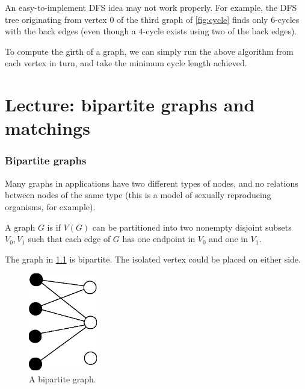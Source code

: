 \begin{note}
An easy-to-implement DFS idea may not work properly. For example,
the DFS tree originating from vertex $0$ of the third graph of
\cref{fig:cycle} finds only $6$-cycles with the back edges (even
though a $4$-cycle exists using two of the back edges).
\end{note}

To compute the girth of a graph, we can simply run the above algorithm
from each vertex in turn, and take the minimum cycle length achieved.

\chapter{Lecture: bipartite graphs and matchings}


\subsection{Bipartite graphs}
\label{subsec:bipartite}

Many graphs in applications have two different types of nodes, and no
relations between nodes of the same type (this is a model of sexually
reproducing organisms, for example).

\begin{Definition}
A graph $G$ is  if $V(G)$  can be partitioned into
two nonempty disjoint subsets $V_0, V_1$ such that each edge of $G$
has one endpoint in $V_0$ and one in $V_1$.
\end{Definition}

\begin{Example}
The graph in \cref{fig:bipartite} is bipartite.  The isolated
vertex could be placed on either side.
\end{Example}

\begin{figure}
\centerline{\includegraphics[width=3cm]{figs/wBipartite.eps}}

\caption{A bipartite graph.}
\label{fig:bipartite}
\end{figure}

